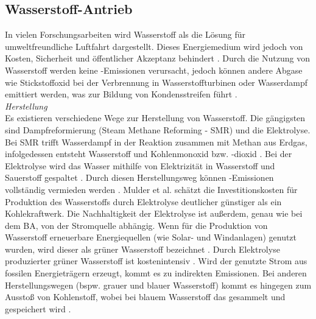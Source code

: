 \subsection{Wasserstoff-Antrieb}
\label{ss:Wasserstoff-Antrieb}

In vielen Forschungsarbeiten wird Wasserstoff als die Lösung für umweltfreundliche Luftfahrt dargestellt.
Dieses Energiemedium wird jedoch von Kosten, Sicherheit und öffentlicher Akzeptanz behindert \cite{ansell2023review}.
Durch die Nutzung von Wasserstoff werden keine -Emissionen verursacht, jedoch können andere Abgase 
wie Stickstoffoxid  bei der Verbrennung in Wasserstoffturbinen oder Wasserdampf emittiert werden, was zur Bildung von Kondensstreifen
führt \cite{hepperle2012electric}.\\
%
\textit{Herstellung}\\
Es existieren verschiedene Wege zur Herstellung von Wasserstoff. 
Die gängigsten sind Dampfreformierung (Steam Methane Reforming - SMR) und die Elektrolyse. %
Bei SMR trifft Wasserdampf in der Reaktion zusammen mit Methan aus Erdgas, infolgedessen entsteht 
Wasserstoff  und Kohlenmonoxid  bzw. -dioxid \cite{mulder2019outlook}. Bei der Elektrolyse wird das Wasser mithilfe von Elektrizität 
in Wasserstoff  und Sauerstoff  gespaltet \cite{mulder2019outlook}. Durch diesen Herstellungsweg können -Emissionen 
vollständig vermieden werden \cite{dalmia2022powering}. 
Mulder et al. \cite{mulder2019outlook} schätzt die Investitionskosten für Produktion des Wasserstoffs durch Elektrolyse deutlicher günstiger als ein Kohlekraftwerk.
Die Nachhaltigkeit der Elektrolyse ist außerdem, genau wie bei dem BA, von der Stromquelle abhängig.
%
Wenn für die Produktion von Wasserstoff erneuerbare Energiequellen (wie Solar- und Windanlagen) genutzt wurden, 
wird dieser als grüner Wasserstoff bezeichnet \cite{mulder2019outlook}. 
Durch Elektrolyse produzierter grüner Wasserstoff ist kostenintensiv \cite{dalmia2022powering}.
Wird der genutzte Strom aus fossilen Energieträgern erzeugt, kommt es zu indirekten Emissionen.
Bei anderen Herstellungswegen (bspw. grauer und blauer Wasserstoff) kommt es hingegen zum Ausstoß von Kohlenstoff, 
wobei bei blauem Wasserstoff das  gesammelt und gespeichert wird \cite{mulder2019outlook}.

